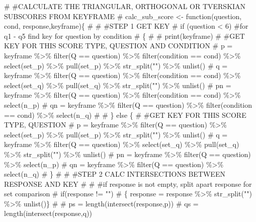 \documentclass[
  letterpaper,
  DIV=11,
  numbers=noendperiod]{scrreprt}
\newenvironment{Shaded}{\begin{snugshade}}{\end{snugshade}}
\newcommand{\CommentTok}[1]{\textcolor[rgb]{0.37,0.37,0.37}{#1}}
\begin{document}
\begin{Shaded}
\begin{Highlighting}[]
\CommentTok{\# \#CALCULATE THE TRIANGULAR, ORTHOGONAL OR TVERSKIAN SUBSCORES FROM KEYFRAME}
\CommentTok{\# calc\_sub\_score \textless{}{-} function(question, cond, response,keyframe)\{}
\CommentTok{\# }
\CommentTok{\#   \#STEP 1 GET KEY}
\CommentTok{\#   if (question \textless{} 6) \#for q1 {-} q5 find key for question by condition}
\CommentTok{\#   \{}
\CommentTok{\#     \# print(keyframe)}
\CommentTok{\#     \#GET KEY FOR THIS SCORE TYPE, QUESTION AND CONDITION}
\CommentTok{\#     p =  keyframe \%\textgreater{}\% filter(Q == question) \%\textgreater{}\% filter(condition == cond) \%\textgreater{}\% select(set\_p) \%\textgreater{}\% pull(set\_p) \%\textgreater{}\% str\_split("") \%\textgreater{}\% unlist()}
\CommentTok{\#     q =  keyframe \%\textgreater{}\% filter(Q == question) \%\textgreater{}\% filter(condition == cond) \%\textgreater{}\% select(set\_q) \%\textgreater{}\% pull(set\_q) \%\textgreater{}\% str\_split("") \%\textgreater{}\% unlist()}
\CommentTok{\#     pn = keyframe \%\textgreater{}\% filter(Q == question) \%\textgreater{}\% filter(condition == cond) \%\textgreater{}\% select(n\_p)}
\CommentTok{\#     qn = keyframe \%\textgreater{}\% filter(Q == question) \%\textgreater{}\% filter(condition == cond) \%\textgreater{}\% select(n\_q)}
\CommentTok{\# }
\CommentTok{\#   \} else \{}
\CommentTok{\#     \#GET KEY FOR THIS SCORE TYPE, QUESTION}
\CommentTok{\#     p =  keyframe \%\textgreater{}\% filter(Q == question) \%\textgreater{}\% select(set\_p) \%\textgreater{}\% pull(set\_p) \%\textgreater{}\% str\_split("") \%\textgreater{}\% unlist()}
\CommentTok{\#     q =  keyframe \%\textgreater{}\% filter(Q == question) \%\textgreater{}\% select(set\_q) \%\textgreater{}\% pull(set\_q) \%\textgreater{}\% str\_split("") \%\textgreater{}\% unlist()}
\CommentTok{\#     pn = keyframe \%\textgreater{}\% filter(Q == question) \%\textgreater{}\% select(n\_p)}
\CommentTok{\#     qn = keyframe \%\textgreater{}\% filter(Q == question) \%\textgreater{}\% select(n\_q)}
\CommentTok{\#   \}}
\CommentTok{\# }
\CommentTok{\#   \#STEP 2 CALC INTERSECTIONS BETWEEN RESPONSE AND KEY}
\CommentTok{\#   }
\CommentTok{\#   \#if response is not empty, split apart response for set comparison}
\CommentTok{\#     if(response != "")}
\CommentTok{\#     \{ response = response \%\textgreater{}\% str\_split("") \%\textgreater{}\% unlist()\}}
\CommentTok{\#     }
\CommentTok{\#   ps = length(intersect(response,p))}
\CommentTok{\#   qs = length(intersect(response,q))}

\end{Highlighting}
\end{Shaded}
\end{document}
